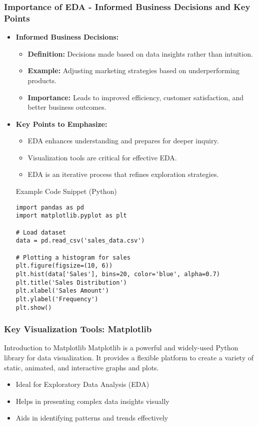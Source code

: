 \documentclass{beamer}
\begin{document}
\begin{frame}[fragile]
    \frametitle{Importance of EDA - Informed Business Decisions and Key Points}
    \begin{itemize}
        \item \textbf{Informed Business Decisions:}
        \begin{itemize}
            \item \textbf{Definition:} Decisions made based on data insights rather than intuition.
            \item \textbf{Example:} Adjusting marketing strategies based on underperforming products.
            \item \textbf{Importance:} Leads to improved efficiency, customer satisfaction, and better business outcomes.
        \end{itemize}
        
        \item \textbf{Key Points to Emphasize:}
        \begin{itemize}
            \item EDA enhances understanding and prepares for deeper inquiry.
            \item Visualization tools are critical for effective EDA.
            \item EDA is an iterative process that refines exploration strategies.
        \end{itemize}
        
        \begin{block}{Example Code Snippet (Python)}
            \begin{lstlisting}
import pandas as pd
import matplotlib.pyplot as plt

# Load dataset
data = pd.read_csv('sales_data.csv')

# Plotting a histogram for sales
plt.figure(figsize=(10, 6))
plt.hist(data['Sales'], bins=20, color='blue', alpha=0.7)
plt.title('Sales Distribution')
plt.xlabel('Sales Amount')
plt.ylabel('Frequency')
plt.show()
            \end{lstlisting}
        \end{block}
    \end{itemize}
\end{frame}

\begin{frame}
    \frametitle{Key Visualization Tools: Matplotlib}
    \begin{block}{Introduction to Matplotlib}
        Matplotlib is a powerful and widely-used Python library for data visualization. It provides a flexible platform to create a variety of static, animated, and interactive graphs and plots.
    \end{block}
    \begin{itemize}
        \item Ideal for Exploratory Data Analysis (EDA)
        \item Helps in presenting complex data insights visually
        \item Aids in identifying patterns and trends effectively
    \end{itemize}
\end{frame}
\end{document}
